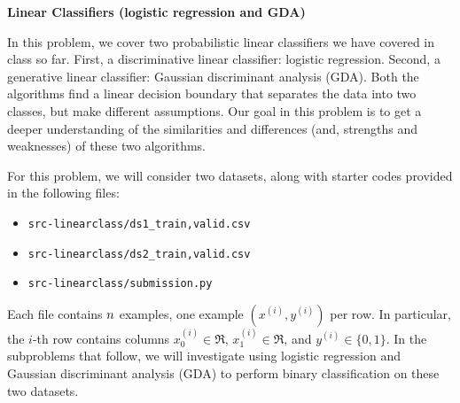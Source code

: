 \item {\bf Linear Classifiers (logistic regression and GDA)}

In this problem, we cover two probabilistic linear classifiers we have covered in class so far. First, a discriminative linear classifier: logistic regression. Second, a generative linear classifier: Gaussian discriminant analysis (GDA). Both the algorithms find a linear decision boundary that separates the data into two classes, but make different assumptions. Our goal in this problem is to get a deeper understanding of the similarities and differences (and, strengths and weaknesses) of these two algorithms.

For this problem, we will consider two datasets, along with starter codes provided in the following files:
\begin{center}
\begin{itemize}
	\item \texttt{src-linearclass/ds1\_{train,valid}.csv}
	\item \texttt{src-linearclass/ds2\_{train,valid}.csv}
  \item \texttt{src-linearclass/submission.py}
\end{itemize}
\end{center}
Each file contains ${n}$ examples, one example $(x^{(i)}, y^{(i)})$ per row. In particular, the $i$-th row contains columns $x^{(i)}_0\in\Re$, $x^{(i)}_1\in\Re$, and $y^{(i)}\in\{0, 1\}$. In the subproblems that follow, we will investigate using logistic regression and Gaussian discriminant analysis (GDA) to perform binary classification on these two datasets.

\begin{enumerate}
	
	
	
	
	
	
	
	
\end{enumerate}
